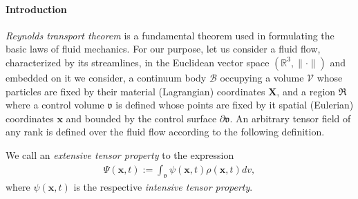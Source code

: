\paragraph{Introduction}
{\em Reynolds transport theorem} \cite{Reynolds:1903} is a fundamental
theorem used in formulating the basic laws of fluid mechanics. For our
purpose, let us consider a fluid flow, characterized by its
streamlines, in the Euclidean vector space
$(\mathbb{R}^3,\lVert\cdot\rVert)$ and embedded on it we consider, a
continuum body $\mathscr{B}$ occupying a volume $\mathscr{V}$ whose
particles are fixed by their material (Lagrangian) coordinates
$\mathbf{X}$, and a region $\Re$ where a control volume $\mathfrak{v}$
is defined whose points are fixed by it spatial (Eulerian) coordinates
$\mathbf{x}$ and bounded by the control surface
$\partial\mathfrak{v}$. An arbitrary tensor field of any rank is
defined over the fluid flow according to the following definition.
\begin{definition*} We call an {\em extensive tensor property} to the expression
\begin{align}
\Psi(\mathbf{x},t):=
\int_{\mathfrak{v}}\psi(\mathbf{x},t)\rho(\mathbf{x},t)dv,
\end{align}
where $\psi(\mathbf{x},t)$ is the respective {\em intensive tensor property}.
\end{definition*}
